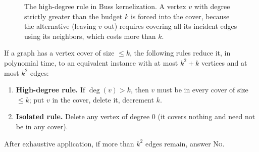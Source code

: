 \begin{figure}[htbp]
\centering
{}
\caption{The high-degree rule in Buss kernelization. A vertex $v$ with degree strictly greater than the budget $k$ is forced into the cover, because the alternative (leaving $v$ out) requires covering all its incident edges using its neighbors, which costs more than $k$.}
\label{ch29:fig-buss}
\end{figure}

\begin{lemma}
\label{ch29:lem-buss}
If a graph has a vertex cover of size $\le k$, the following rules reduce it, in
polynomial time, to an equivalent instance with at most $k^2+k$ vertices and at
most $k^2$ edges:
\begin{enumerate}
  \item \textbf{High-degree rule.} If $\deg(v)>k$, then $v$ must be in every
        cover of size $\le k$; put $v$ in the cover, delete it, decrement $k$.
  \item \textbf{Isolated rule.} Delete any vertex of degree $0$ (it covers
        nothing and need not be in any cover).
\end{enumerate}
After exhaustive application, if more than $k^2$ edges remain, answer \textsc{No}.
\end{lemma}

